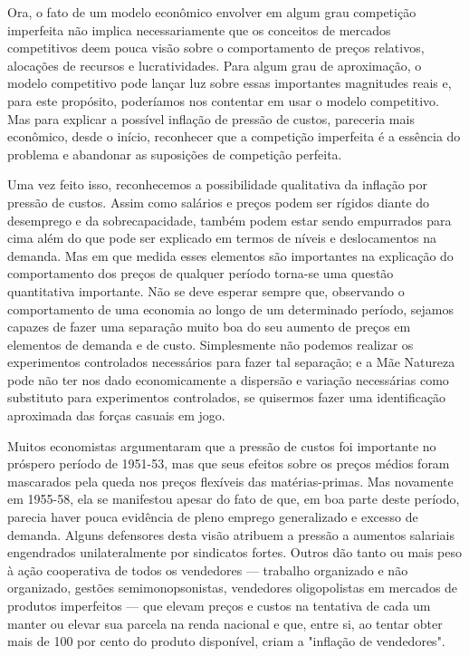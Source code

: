 \documentclass[12pt]{article}
\begin{document}
Ora, o fato de um modelo econômico envolver em algum grau competição imperfeita não implica necessariamente que os conceitos de mercados competitivos deem pouca visão sobre o comportamento de preços relativos, alocações de recursos e lucratividades. Para algum grau de aproximação, o modelo competitivo pode lançar luz sobre essas importantes magnitudes reais e, para este propósito, poderíamos nos contentar em usar o modelo competitivo. Mas para explicar a possível inflação de pressão de custos, pareceria mais econômico, desde o início, reconhecer que a competição imperfeita é a essência do problema e abandonar as suposições de competição perfeita.

Uma vez feito isso, reconhecemos a possibilidade qualitativa da inflação por pressão de custos. Assim como salários e preços podem ser rígidos diante do desemprego e da sobrecapacidade, também podem estar sendo empurrados para cima além do que pode ser explicado em termos de níveis e deslocamentos na demanda. Mas em que medida esses elementos são importantes na explicação do comportamento dos preços de qualquer período torna-se uma questão quantitativa importante. Não se deve esperar sempre que, observando o comportamento de uma economia ao longo de um determinado período, sejamos capazes de fazer uma separação muito boa do seu aumento de preços em elementos de demanda e de custo. Simplesmente não podemos realizar os experimentos controlados necessários para fazer tal separação; e a Mãe Natureza pode não ter nos dado economicamente a dispersão e variação necessárias como substituto para experimentos controlados, se quisermos fazer uma identificação aproximada das forças casuais em jogo.

Muitos economistas argumentaram que a pressão de custos foi importante no próspero período de 1951-53, mas que seus efeitos sobre os preços médios foram mascarados pela queda nos preços flexíveis das matérias-primas. Mas novamente em 1955-58, ela se manifestou apesar do fato de que, em boa parte deste período, parecia haver pouca evidência de pleno emprego generalizado e excesso de demanda. Alguns defensores desta visão atribuem a pressão a aumentos salariais engendrados unilateralmente por sindicatos fortes. Outros dão tanto ou mais peso à ação cooperativa de todos os vendedores — trabalho organizado e não organizado, gestões semimonopsonistas, vendedores oligopolistas em mercados de produtos imperfeitos — que elevam preços e custos na tentativa de cada um manter ou elevar sua parcela na renda nacional e que, entre si, ao tentar obter mais de 100 por cento do produto disponível, criam a "inflação de vendedores".
\end{document}
